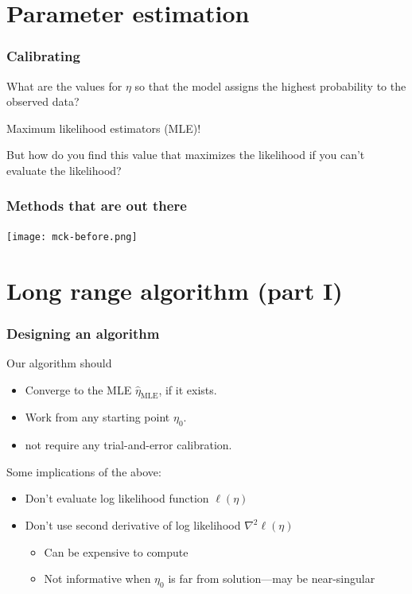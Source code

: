 \documentclass[slidestop,compress, 10pt]{beamer}
\newcommand{\etaMLE}{\hat{\eta}_{\textrm{MLE}}}
\begin{document}
\section{Parameter estimation}
\frame
{
\frametitle{Calibrating}
What are the values for $\eta$ so that the model assigns the highest probability to the observed data?

Maximum likelihood estimators (MLE)!

But how do you find this value that maximizes the likelihood if you can't evaluate the likelihood?
}

\frame
{
\frametitle{Methods that are out there}
\begin{center} 
\texttt{[image: mck-before.png]}
\end{center} 
}
\section{Long range algorithm (part I)}
\frame
{
\frametitle{Designing an algorithm}

Our algorithm should
\begin{itemize}
\item Converge to the MLE $\etaMLE$, if it exists.
\item Work from any starting point $\eta_0$.
\item not require any trial-and-error calibration.
\end{itemize}

Some implications of the above:
\begin{itemize}
\item Don't evaluate log likelihood function $\ell( \eta)$
\item Don't use second derivative of log likelihood $\nabla^2 \ell( \eta)$
\begin{itemize}
	\item Can be expensive to compute
	\item Not informative when $\eta_0$ is far from solution---may be near-singular
\end{itemize}
\end{itemize}
}
\end{document}
